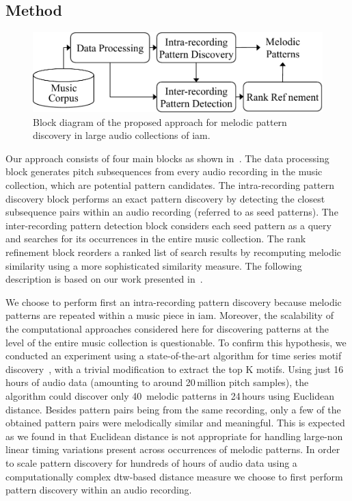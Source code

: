 \subsection{Method}
\label{sec:patterns_discovery_method}

\begin{figure}
	\begin{center}
		\includegraphics[width=\figSizeEightyFive]{ch06_patterns/figures/discovery/blockDiagram_Overall.pdf}
	\end{center}
	\caption[Block diagram for melodic pattern discovery]{Block diagram of the proposed approach for melodic pattern discovery in large audio collections of \gls{iam}.}
	\label{fig:pattern_discovery_overall_block_diagram}
\end{figure}

Our approach consists of four main blocks as shown in~. The data processing block generates pitch subsequences from every audio recording in the music collection, which are potential pattern candidates. The intra-recording pattern discovery block performs an exact pattern discovery by detecting the closest subsequence pairs within an audio recording (referred to as seed patterns). The inter-recording pattern detection block considers each seed pattern as a query and searches for its occurrences in the entire music collection. The rank refinement block reorders a ranked list of search results by recomputing melodic similarity using a more sophisticated similarity measure. The following description is based on our work presented in~\cite{gulati_SITIS_2014}.

We choose to perform first an intra-recording pattern discovery because melodic patterns are repeated within a music piece in \gls{iam}. Moreover, the scalability of the computational approaches considered here for discovering patterns at the level of the entire music collection is questionable. To confirm this hypothesis, we conducted an experiment using a state-of-the-art algorithm for time series motif discovery~\citep{Mueen2009}, with a trivial modification to extract the top K motifs. Using just 16\,hours of audio data (amounting to around 20\,million pitch samples), the algorithm could discover only 40~melodic patterns in 24\,hours using Euclidean distance. Besides pattern pairs being from the same recording, only a few of the obtained pattern pairs were melodically similar and meaningful. This is expected as we found in  that Euclidean distance is not appropriate for handling large-non linear timing variations present across occurrences of melodic patterns. In order to scale pattern discovery for hundreds of hours of audio data using a computationally complex \gls{dtw}-based distance measure we choose to first perform pattern discovery within an audio recording.


